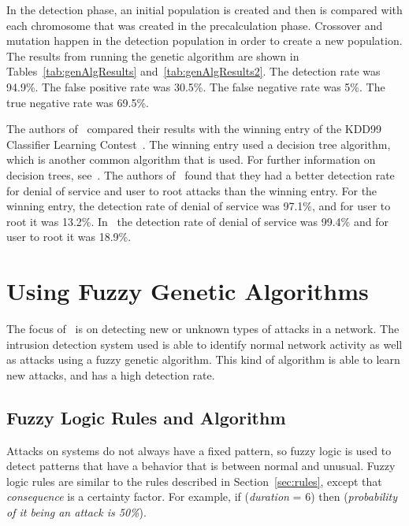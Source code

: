 \documentclass{sig-alternate}
\begin{document}
In the detection phase, an initial population is created and then is compared with each chromosome that was created in the precalculation phase. Crossover and mutation happen in the detection population in order to create a new population. The results from running the genetic algorithm are shown in Tables~\ref{tab:genAlgResults} and~\ref{tab:genAlgResults2}. The detection rate was 94.9\%. The false positive rate was 30.5\%. The false negative rate was 5\%. The true negative rate was 69.5\%.

The authors of~\cite{DBLP:journals/corr/abs-1204-1336} compared their results with the winning entry of the KDD99 Classifier Learning Contest~\cite{KDD99Contest}. The winning entry used a decision tree algorithm, which is another common algorithm that is used. For further information on decision trees, see~\cite{decisionTree}. The authors of~\cite{DBLP:journals/corr/abs-1204-1336} found that they had a better detection rate for denial of service and user to root attacks than the winning entry. For the winning entry, the detection rate of denial of service was 97.1\%, and for user to root it was 13.2\%. In~\cite{DBLP:journals/corr/abs-1204-1336} the detection rate of denial of service was 99.4\% and for user to root it was 18.9\%.




\section{Using Fuzzy Genetic Algorithms}
\label{sec:fuzGenAlgImp}
The focus of~\cite{6496342, 6559603} is on detecting new or unknown types of attacks in a network. The intrusion detection system used is able to identify normal network activity as well as attacks using a fuzzy genetic algorithm. This kind of algorithm is able to learn new attacks, and has a high detection rate. 




\subsection{Fuzzy Logic Rules and Algorithm}
Attacks on systems do not always have a fixed pattern, so fuzzy logic is used to detect patterns that have a behavior that is between normal and unusual. Fuzzy logic rules are similar to the rules described in Section~\ref{sec:rules}, except that \emph{consequence} is a certainty factor. For example, if (\emph{duration} = 6) then (\emph{probability of it being an attack is 50\%}).
\end{document}
